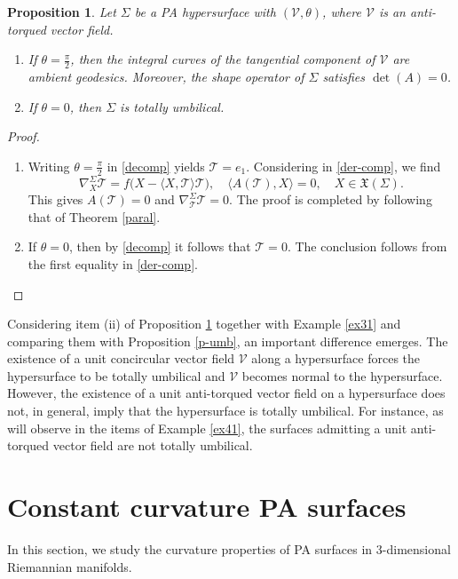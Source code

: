 \documentclass[12pt,reqno]{amsart}
\def\v{\mathcal V}
\def\t{\mathcal T}
\def\x{\mathfrak X}
\newtheorem{proposition}[theorem]{Proposition}
\theoremstyle{definition}
\begin{document}
\begin{proposition}\label{zeroangle}
Let $\Sigma$ be a PA hypersurface with $(\v,\theta)$, where $\v$ is an anti-torqued vector field.  
\begin{enumerate}
\item[(i)] If $\theta=\frac{\pi}{2}$, then the integral curves of the tangential component of $\v$ are ambient geodesics. Moreover,  the shape operator of $\Sigma$  satisfies $\operatorname{det}(A)=0$.
\item[(ii)] If $\theta=0$, then $\Sigma$ is totally umbilical. 
\end{enumerate}
\end{proposition}
\begin{proof} 
\begin{enumerate}
\item[(i)] Writing $\theta=\frac{\pi}{2}$ in \eqref{decomp} yields $\t=e_1$. Considering in \eqref{der-comp}, we find 
$$
\nabla^\Sigma_X\t=f\big(X-\langle X,\t\rangle \t\big) , \quad \langle A(\t),X\rangle=0, \quad X\in \x(\Sigma).
$$
This gives $A(\t)=0$ and $\nabla^\Sigma_{\t}\t=0$. The proof is completed by following that of Theorem \ref{paral}.
\item[(ii)]  If $\theta=0$, then by \eqref{decomp} it follows that $\t=0$. The conclusion follows from the first equality in \eqref{der-comp}.
\end{enumerate}
\end{proof}

Considering item (ii) of Proposition \ref{zeroangle} together with Example \ref{ex31} and comparing them with Proposition \ref{p-umb}, an important difference emerges. The existence of a unit concircular vector field $\v$ along a hypersurface forces the hypersurface to be totally umbilical and $\v$ becomes normal to the hypersurface. However, the existence of a unit anti-torqued vector field on a hypersurface does not, in general, imply that the hypersurface is totally umbilical. For instance, as will observe in the items of Example \ref{ex41}, the surfaces admitting a unit anti-torqued vector field are not totally umbilical.

\section{Constant curvature PA surfaces} \label{sec4}

In this section, we study the curvature properties of PA surfaces in $3$-dimensional Riemannian manifolds. 
\end{document}
